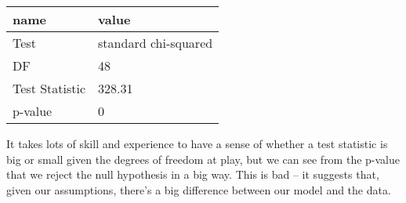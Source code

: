 \documentclass[
  letterpaper,
  DIV=11,
  numbers=noendperiod]{scrreprt}
\newenvironment{Shaded}{\begin{snugshade}}{\end{snugshade}}
\newcommand{\AttributeTok}[1]{\textcolor[rgb]{0.40,0.45,0.13}{#1}}
\newcommand{\DecValTok}[1]{\textcolor[rgb]{0.68,0.00,0.00}{#1}}
\newcommand{\DocumentationTok}[1]{\textcolor[rgb]{0.37,0.37,0.37}{\textit{#1}}}
\newcommand{\FunctionTok}[1]{\textcolor[rgb]{0.28,0.35,0.67}{#1}}
\newcommand{\NormalTok}[1]{\textcolor[rgb]{0.00,0.23,0.31}{#1}}
\newcommand{\OtherTok}[1]{\textcolor[rgb]{0.00,0.23,0.31}{#1}}
\newcommand{\SpecialCharTok}[1]{\textcolor[rgb]{0.37,0.37,0.37}{#1}}
\newcommand{\StringTok}[1]{\textcolor[rgb]{0.13,0.47,0.30}{#1}}
\begin{document}
\begin{Shaded}
\end{Shaded}

\begin{longtable}[]{@{}ll@{}}
\toprule()
name & value \\
\midrule()
\endhead
Test & standard chi-squared \\
DF & 48 \\
Test Statistic & 328.31 \\
p-value & 0 \\
\bottomrule()
\end{longtable}

It takes lots of skill and experience to have a sense of whether a test
statistic is big or small given the degrees of freedom at play, but we
can see from the p-value that we reject the null hypothesis in a big
way. This is bad -- it suggests that, given our assumptions, there's a
big difference between our model and the data.
\end{document}
